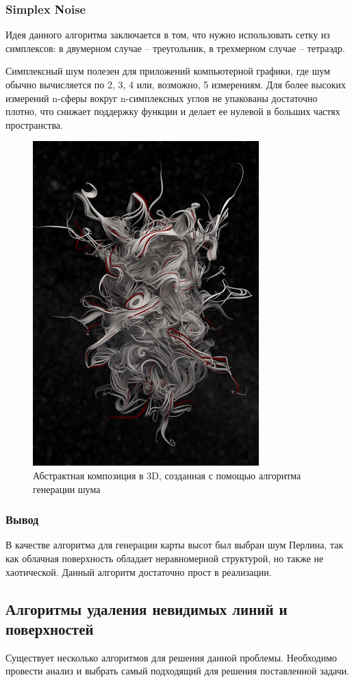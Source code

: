 \documentclass[14pt, a4paper]{extarticle}
\begin{document}
\subsubsection{Simplex Noise}
Идея данного алгоритма заключается  в том, что нужно использовать сетку из симплексов: в двумерном случае – треугольник, в трехмерном случае – тетраэдр.\par
Симплексный шум полезен для приложений компьютерной графики, где шум обычно вычисляется по 2, 3, 4 или, возможно, 5 измерениям. Для более высоких измерений n-сферы вокруг n-симплексных углов не упакованы достаточно плотно, что снижает поддержку функции и делает ее нулевой в больших частях пространства.
\begin{figure}[h!]
	\centering
	\includegraphics[scale=0.65]{source/simplex}
	\caption{Абстрактная композиция в 3D, созданная с помощью алгоритма генерации шума}
	\label{InterpolGuro}
\end{figure}
\newpage
\subsubsection{Вывод}
В качестве алгоритма для генерации карты высот был выбран шум Перлина, так как облачная поверхность обладает неравномерной структурой, но также не хаотической. Данный алгоритм достаточно прост в реализации.

\subsection{Алгоритмы удаления невидимых линий и поверхностей}
Существует несколько алгоритмов для решения данной проблемы. Необходимо провести анализ и выбрать самый подходящий для решения поставленной задачи.\par
\end{document}
